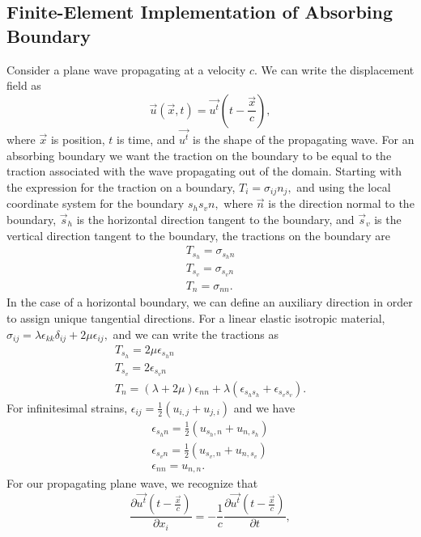 \subsection{Finite-Element Implementation of Absorbing Boundary}

Consider a plane wave propagating at a velocity $c$. We can write
the displacement field as
\begin{equation}
\vec{u}(\vec{x},t)=\vec{u^{t}}(t-\frac{\vec{x}}{c}),
\end{equation}
where $\vec{x}$ is position, $t$ is time, and $\vec{u^{t}}$ is
the shape of the propagating wave. For an absorbing boundary we want
the traction on the boundary to be equal to the traction associated
with the wave propagating out of the domain. Starting with the expression
for the traction on a boundary, $T_{i}=\sigma_{ij}n_{j},$ and using
the local coordinate system for the boundary $s_{h}s_{v}n,$ where
$\vec{n}$ is the direction normal to the boundary, $\overrightarrow{s}_{h}$
is the horizontal direction tangent to the boundary, and $\overrightarrow{s}_{v}$
is the vertical direction tangent to the boundary, the tractions on
the boundary are
\begin{gather}
T_{s_{h}}=\sigma_{s_{h}n}\\
T_{s_{v}}=\sigma_{s_{v}n}\\
T_{n}=\sigma_{nn}.
\end{gather}
In the case of a horizontal boundary, we can define an auxiliary direction
in order to assign unique tangential directions. For a linear elastic
isotropic material, $\sigma_{ij}=\lambda\epsilon_{kk}\delta_{ij}+2\mu\epsilon_{ij},$
and we can write the tractions as 
\begin{gather}
T_{s_{h}}=2\mu\epsilon_{s_{h}n}\\
T_{s_{v}}=2\epsilon_{s_{v}n}\\
T_{n}=(\lambda+2\mu)\epsilon_{nn}+\lambda(\epsilon_{s_{h}s_{h}}+\epsilon_{s_{v}s_{v}}).
\end{gather}
For infinitesimal strains, $\epsilon_{ij}=\frac{1}{2}(u_{i,j}+u_{j,i})$
and we have
\begin{gather}
\epsilon_{s_{h}n}=\frac{1}{2}(u_{s_{h},n}+u_{n,s_{h}})\\
\epsilon_{s_{v}n}=\frac{1}{2}(u_{s_{v},n}+u_{n,s_{v}})\\
\epsilon_{nn}=u_{n,n}.
\end{gather}
For our propagating plane wave, we recognize that
\begin{equation}
\frac{\partial\vec{u^{t}}(t-\frac{\vec{x}}{c})}{\partial x_{i}}=-\frac{1}{c}\frac{\partial\vec{u^{t}}(t-\frac{\vec{x}}{c})}{\partial t},
\end{equation}
